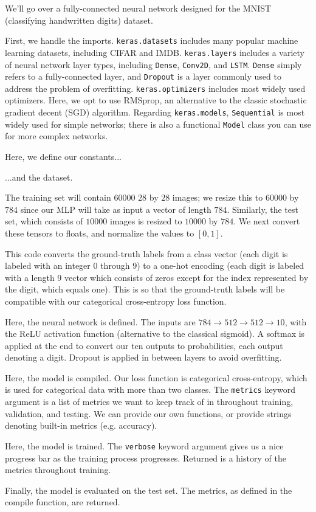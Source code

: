\documentclass{article}
\begin{document}
    We'll go over a fully-connected neural network designed for the MNIST (classifying handwritten digits) dataset.
    
    First, we handle the imports. \verb|keras.datasets| includes many popular machine learning datasets, including CIFAR and IMDB. \verb|keras.layers| includes a variety of neural network layer types, including \verb|Dense|, \verb|Conv2D|, and \verb|LSTM|. \verb|Dense| simply refers to a fully-connected layer, and \verb|Dropout| is a layer commonly used to address the problem of overfitting. \verb|keras.optimizers| includes most widely used optimizers. Here, we opt to use RMSprop, an alternative to the classic stochastic gradient decent (SGD) algorithm. Regarding \verb|keras.models|, \verb|Sequential| is most widely used for simple networks; there is also a functional \verb|Model| class you can use for more complex networks.
    
    Here, we define our constants...
    
    ...and the dataset.
    
    The training set will contain $60000$ $28$ by $28$ images; we resize this to $60000$ by $784$ since our MLP will take as input a vector of length $784$. Similarly, the test set, which consists of $10000$ images is resized to $10000$ by $784$. We next convert these tensors to floats, and normalize the values to $[0,1]$. 
    
    This code converts the ground-truth labels from a class vector (each digit is labeled with an integer $0$ through $9$) to a one-hot encoding (each digit is labeled with a length $9$ vector which consists of zeros except for the index represented by the digit, which equals one). This is so that the ground-truth labels will be compatible with our categorical cross-entropy loss function.
    
    Here, the neural network is defined. The inputs are $784 \rightarrow 512 \rightarrow 512 \rightarrow 10$, with the ReLU activation function (alternative to the classical sigmoid). A softmax is applied at the end to convert our ten outputs to probabilities, each output denoting a digit. Dropout is applied in between layers to avoid overfitting.
    
    Here, the model is compiled. Our loss function is categorical cross-entropy, which is used for categorical data with more than two classes. The \verb|metrics| keyword argument is a list of metrics we want to keep track of in throughout training, validation, and testing. We can provide our own functions, or provide strings denoting built-in metrics (e.g. accuracy). 
    
    Here, the model is trained. The \verb|verbose| keyword argument gives us a nice progress bar as the training process progresses. Returned is a history of the metrics throughout training.
    
    Finally, the model is evaluated on the test set. The metrics, as defined in the compile function, are returned.
\end{document}
